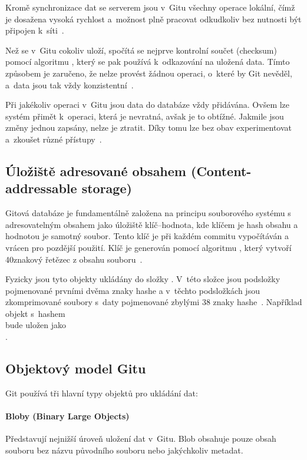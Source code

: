 Kromě synchronizace dat se serverem jsou v~Gitu všechny operace lokální, čímž je dosažena vysoká rychlost a~možnost plně pracovat odkudkoliv bez nutnosti být připojen k~síti~\cite{chacon2014progit}.

Než se v~Gitu cokoliv uloží, spočítá se nejprve kontrolní součet (checksum) pomocí algoritmu , který se pak používá k~odkazování na uložená data. Tímto způsobem je zaručeno, že nelze provést žádnou operaci, o~které by Git nevěděl, a~data jsou tak vždy konzistentní~\cite{chacon2014progit}.

Při jakékoliv operaci v~Gitu jsou data do databáze vždy přidávána. Ovšem lze systém přimět k~operaci, která je nevratná, avšak je to obtížné. Jakmile jsou změny jednou zapsány, nelze je ztratit. Díky tomu lze bez obav experimentovat a~zkoušet různé přístupy~\cite{chacon2014progit}.

\subsection*{Úložiště adresované obsahem (Content-addressable storage)}
\label{sec:git_content_addressable_storage}
Gitová databáze je fundamentálně založena na principu souborového systému s adresovatelným obsahem jako úložiště klíč--hodnota, kde klíčem je hash obsahu a hodnotou je samotný soubor. Tento klíč je při každém commitu vypočítáván a vrácen pro pozdější použití.
Klíč je generován pomocí algoritmu , který vytvoří 40znakový řetězec z obsahu souboru~\cite{chacon2014progit}.

Fyzicky jsou tyto objekty ukládány do složky . V~této složce jsou podsložky pojmenované prvními dvěma znaky hashe a v~těchto podsložkách jsou zkomprimované soubory s~daty pojmenované zbylými 38 znaky hashe~\cite{chacon2014progit}. Například objekt s~hashem \\  bude uložen jako \\ .


\subsection*{Objektový model Gitu}
\label{sec:git_object_model}
Git používá tři hlavní typy objektů pro ukládání dat:

\paragraph*{Bloby (Binary Large Objects)} \label{par:git:bloby}
Představují nejnižší úroveň uložení dat v~Gitu. Blob obsahuje pouze obsah souboru bez názvu původního souboru nebo jakýchkoliv metadat.


